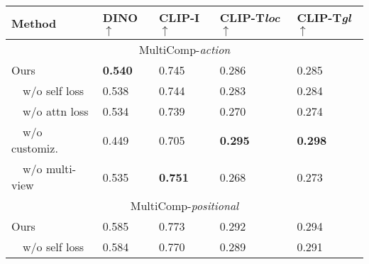 \begin{table}[t!]

\centering
\begin{adjustbox}{width=0.47\textwidth}

\begin{tabular}{lllll} %
\toprule
\textbf{Method}                            & \textbf{DINO$\uparrow$} & \textbf{CLIP-I$\uparrow$} & \textbf{CLIP-T\textit{loc}$\uparrow$} & \textbf{CLIP-T\textit{gl}$\uparrow$} \\ 
\midrule \multicolumn{5}{c}{MultiComp-\textit{action}}
\\ \midrule
Ours       &    \textbf{0.540}                                                                                                  &  0.745              &   0.286   &                    0.285                      \\
\ \ w/o self loss       &    0.538                                                                                                  &  0.744              &   0.283   &                    0.284                    \\
\ \ w/o attn loss       &    0.534                                                                                                  &  0.739             &   0.270   &                    0.274                     \\
\ \ w/o customiz.       &    0.449                                                                                                 &  0.705              &   \textbf{0.295}   &                    \textbf{0.298}                     \\
\ \ w/o multi-view       &    0.535                                                                                                  &  \textbf{0.751}              &   0.268   &                    0.273                     \\
\midrule \multicolumn{5}{c}{MultiComp-\textit{positional}}
\\ \midrule
Ours       &    0.585                                                                                                  &  0.773              &   0.292   &                    0.294                      \\
\ \ w/o self loss       &    0.584                                                                                                  &  0.770              &   0.289   &                    0.291                     \\

\end{tabular}
\end{adjustbox}
\end{table}
